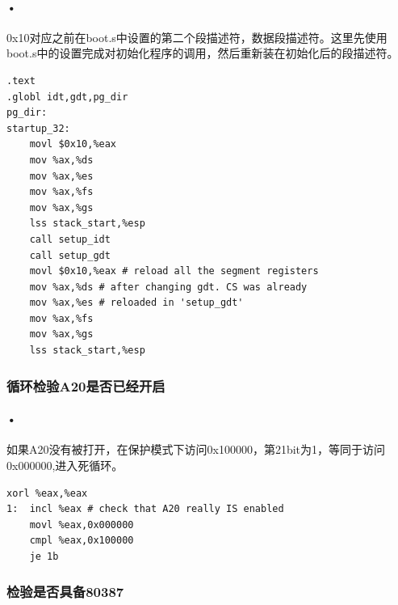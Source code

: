 \documentclass[12pt]{article}
\begin{document}
\paragraph{•}
0x10对应之前在boot.s中设置的第二个段描述符，数据段描述符。这里先使用boot.s中的设置完成对初始化程序的调用，然后重新装在初始化后的段描述符。
\begin{lstlisting}[breaklines]
.text
.globl idt,gdt,pg_dir
pg_dir:
startup_32:
	movl $0x10,%eax
	mov %ax,%ds
	mov %ax,%es
	mov %ax,%fs
	mov %ax,%gs
	lss stack_start,%esp
	call setup_idt
	call setup_gdt
	movl $0x10,%eax # reload all the segment registers
	mov %ax,%ds # after changing gdt. CS was already
	mov %ax,%es # reloaded in 'setup_gdt'
	mov %ax,%fs
	mov %ax,%gs
	lss stack_start,%esp
\end{lstlisting}
\subsubsection{循环检验A20是否已经开启}	
\paragraph{•}
如果A20没有被打开，在保护模式下访问0x100000，第21bit为1，等同于访问0x000000,进入死循环。
\begin{lstlisting}[breaklines]
	xorl %eax,%eax
1:	incl %eax # check that A20 really IS enabled
	movl %eax,0x000000
	cmpl %eax,0x100000
	je 1b
\end{lstlisting}
\subsubsection{检验是否具备80387}	
\end{document}
